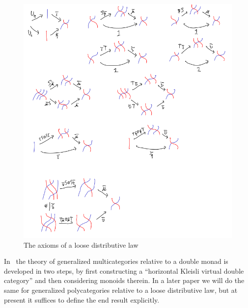 \documentclass{amsart}
\begin{document}
\begin{figure}
  \centering
  \includegraphics[width=\textwidth]{hdl-axioms.png}
  \caption{The axioms of a loose distributive law}
  \label{fig:hdl-axioms}
\end{figure}

In~\cite{cs:genmulti} the theory of generalized multicategories relative to a double monad is developed in two steps, by first constructing a ``horizontal Kleisli virtual double category'' and then considering monoids therein.
In a later paper we will do the same for generalized polycategories relative to a loose distributive law, but at present it suffices to define the end result explicitly.
\end{document}
